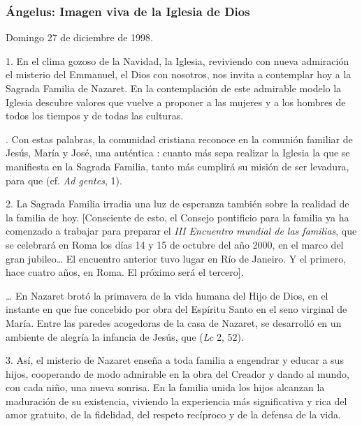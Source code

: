 \begin{body}
\begin{body}
\subsubsection{Ángelus: Imagen viva de la Iglesia de Dios}

Domingo 27 de diciembre de 1998.

1. En el clima gozoso de la Navidad, la Iglesia, reviviendo con nueva admiración el misterio del Emmanuel, el Dios con nosotros, nos invita a contemplar hoy a la Sagrada Familia de Nazaret. En la contemplación de este admirable modelo la Iglesia descubre valores que vuelve a proponer a las mujeres y a los hombres de todos los tiempos y de todas las culturas.

. Con estas palabras, la comunidad cristiana reconoce en la comunión familiar de Jesús, María y José, una auténtica : cuanto más sepa realizar la Iglesia la  que se manifiesta en la Sagrada Familia, tanto más cumplirá su misión de ser levadura, para que  (cf. \emph{Ad gentes}, 1).

2. La Sagrada Familia irradia una luz de esperanza también sobre la realidad de la familia de hoy. {[}Consciente de esto, el Consejo pontificio para la familia ya ha comenzado a trabajar para preparar el \emph{III Encuentro mundial de las familias}, que se celebrará en Roma los días 14 y 15 de octubre del año 2000, en el marco del gran jubileo\ldots{} El encuentro anterior tuvo lugar en Río de Janeiro. Y el primero, hace cuatro años, en Roma. El próximo será el tercero{]}.

\ldots{} En Nazaret brotó la primavera de la vida humana del Hijo de Dios, en el instante en que fue concebido por obra del Espíritu Santo en el seno virginal de María. Entre las paredes acogedoras de la casa de Nazaret, se desarrolló en un ambiente de alegría la infancia de Jesús, que  (\emph{Lc} 2, 52).

3. Así, el misterio de Nazaret enseña a toda familia a engendrar y educar a sus hijos, cooperando de modo admirable en la obra del Creador y dando al mundo, con cada niño, una nueva sonrisa. En la familia unida los hijos alcanzan la maduración de su existencia, viviendo la experiencia más significativa y rica del amor gratuito, de la fidelidad, del respeto recíproco y de la defensa de la vida.


\end{body}
\end{body}
